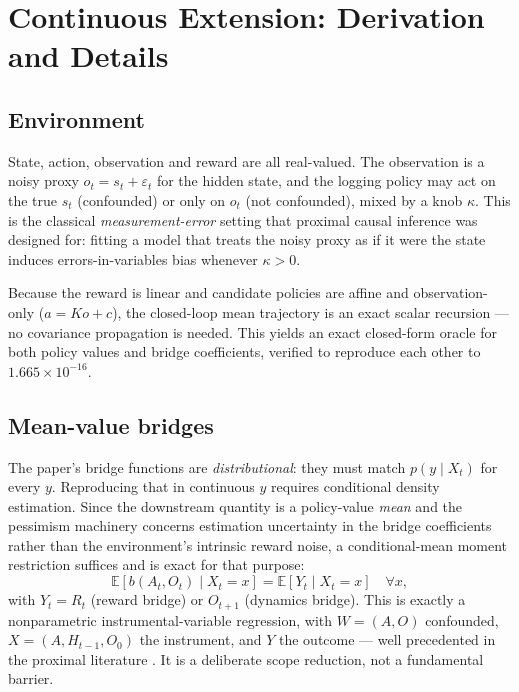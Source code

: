 \section{Continuous Extension: Derivation and Details}
\label{app:cont}

\subsection{Environment}
State, action, observation and reward are all real-valued. The observation is a
noisy proxy $o_t = s_t + \varepsilon_t$ for the hidden state, and the logging
policy may act on the true $s_t$ (confounded) or only on $o_t$ (not confounded),
mixed by a knob $\kappa$. This is the classical \emph{measurement-error} setting
that proximal causal inference was designed for: fitting a model that treats the
noisy proxy as if it were the state induces errors-in-variables bias whenever
$\kappa > 0$.

Because the reward is linear and candidate policies are affine and
observation-only ($a = K o + c$), the closed-loop mean trajectory is an exact
scalar recursion --- no covariance propagation is needed. This yields an exact
closed-form oracle for both policy values and bridge coefficients, verified to
reproduce each other to $1.665\times10^{-16}$.

\subsection{Mean-value bridges}
The paper's bridge functions are \emph{distributional}: they must match
$p(y \mid X_t)$ for every $y$. Reproducing that in continuous $y$ requires
conditional density estimation. Since the downstream quantity is a policy-value
\emph{mean} and the pessimism machinery concerns estimation uncertainty in the
bridge coefficients rather than the environment's intrinsic reward noise, a
conditional-mean moment restriction suffices and is exact for that purpose:
\begin{equation}
\mathbb{E}\!\left[b(A_t, O_t) \mid X_t = x\right]
= \mathbb{E}\!\left[Y_t \mid X_t = x\right] \quad \forall x,
\end{equation}
with $Y_t = R_t$ (reward bridge) or $O_{t+1}$ (dynamics bridge). This is exactly
a nonparametric instrumental-variable regression, with $W = (A, O)$ confounded,
$X = (A, H_{t-1}, O_0)$ the instrument, and $Y$ the outcome --- well precedented
in the proximal literature \citep{mastouri2021}. It is a deliberate scope
reduction, not a fundamental barrier.


